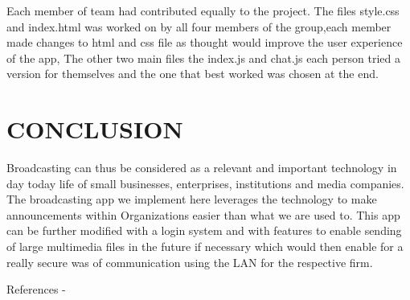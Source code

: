 \documentclass{fisatproject}
\begin{document}
Each member of team had contributed equally to the project. The files style.css and index.html was worked on by all four members of the group,each member made changes to html and css file as thought would improve the user experience of the app, The other two main files the index.js and chat.js each person tried a version for themselves and the one that best worked was chosen at the end.






\chapter{CONCLUSION}

Broadcasting can thus be considered as a relevant and important technology in day today life of small businesses, enterprises, institutions and media companies. The broadcasting app we implement here leverages the technology to make announcements within Organizations easier than what we are used to. This app can be further modified with a login system and with features to enable sending of large multimedia files in the future if necessary which would then enable for a really secure was of communication using the LAN for the respective firm.
\newpage





\maketitle
References -\cite{rai2013socket,spurlock2013bootstrap,tilkov2010node}
\end{document}
